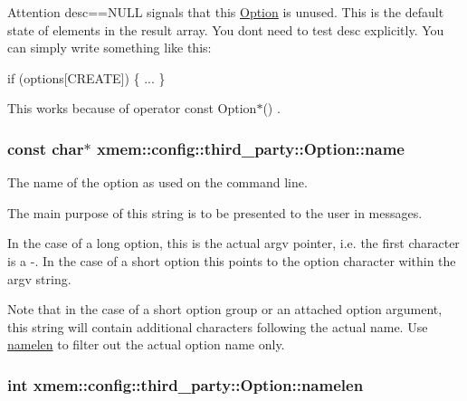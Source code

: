 \begin{DoxyAttention}{Attention}
{\ttfamily desc==N\+U\+L\+L} signals that this \hyperlink{classxmem_1_1config_1_1third__party_1_1_option}{Option} is unused. This is the default state of elements in the result array. You don\textquotesingle{}t need to test {\ttfamily desc} explicitly. You can simply write something like this\+: 
\begin{DoxyCode}
\textcolor{keywordflow}{if} (options[CREATE])
\{
  ...
\}
\end{DoxyCode}
 This works because of {\ttfamily  operator const Option$\ast$() }. 
\end{DoxyAttention}
\hypertarget{classxmem_1_1config_1_1third__party_1_1_option_aa73b73027c0a9140aeec654f3fe9aef6}{}
\subsubsection[{name}]{\setlength{\rightskip}{0pt plus 5cm}const char$\ast$ xmem\+::config\+::third\+\_\+party\+::\+Option\+::name}\label{classxmem_1_1config_1_1third__party_1_1_option_aa73b73027c0a9140aeec654f3fe9aef6}


The name of the option as used on the command line. 

The main purpose of this string is to be presented to the user in messages.

In the case of a long option, this is the actual {\ttfamily argv} pointer, i.\+e. the first character is a \textquotesingle{}-\/\textquotesingle{}. In the case of a short option this points to the option character within the {\ttfamily argv} string.

Note that in the case of a short option group or an attached option argument, this string will contain additional characters following the actual name. Use \hyperlink{classxmem_1_1config_1_1third__party_1_1_option_ab9c40a964cbbde704d77407446a76933}{namelen} to filter out the actual option name only. \hypertarget{classxmem_1_1config_1_1third__party_1_1_option_ab9c40a964cbbde704d77407446a76933}{}
\subsubsection[{namelen}]{\setlength{\rightskip}{0pt plus 5cm}int xmem\+::config\+::third\+\_\+party\+::\+Option\+::namelen}\label{classxmem_1_1config_1_1third__party_1_1_option_ab9c40a964cbbde704d77407446a76933}


